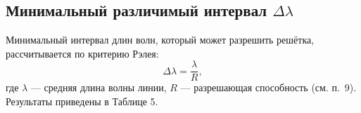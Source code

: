 \subsection*{Минимальный различимый интервал \(\Delta\lambda\)}

Минимальный интервал длин волн, который может разрешить решётка, рассчитывается по критерию Рэлея:
\[
	\Delta\lambda = \frac{\lambda}{R},
\]
где \(\lambda\) — средняя длина волны линии, \(R\) — разрешающая способность (см. п.~9).
Результаты приведены в Таблице 5.
